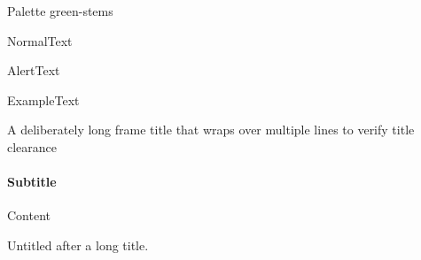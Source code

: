 \documentclass[aspectratio=169]{beamer}
\begin{document}
\begin{frame}{Palette green-stems}\begin{block}{Normal}Text\end{block}\begin{alertblock}{Alert}Text\end{alertblock}\begin{exampleblock}{Example}Text\end{exampleblock}\end{frame}
\begin{frame}{A deliberately long frame title that wraps over multiple lines to verify title clearance}\framesubtitle{Subtitle}Content\end{frame}
\begin{frame}Untitled after a long title.\end{frame}
\end{document}
